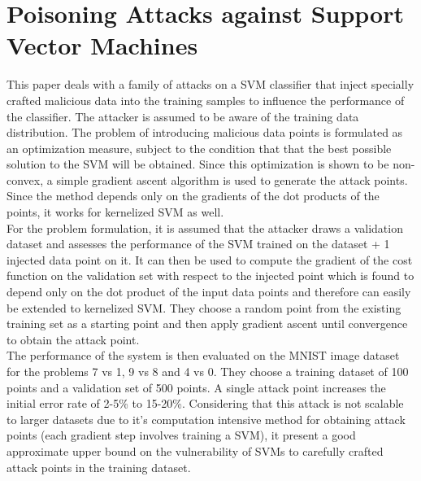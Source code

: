 \documentclass[11pt]{article}
\begin{document}
\section{Poisoning Attacks against Support Vector Machines} 
This paper deals with a family of attacks on a SVM classifier that inject specially crafted malicious data into the training samples to influence the performance of the classifier. The attacker is assumed to be aware of the training data distribution. The problem of introducing malicious data points is formulated as an optimization measure, subject to the condition that that the best possible solution to the SVM will be obtained. Since this optimization is shown to be non-convex, a simple gradient ascent algorithm is used to generate the attack points. Since the method depends only on the gradients of the dot products of the points, it works for kernelized SVM as well. \\For the problem formulation, it is assumed that the attacker draws a validation dataset and assesses the performance of the SVM trained on the dataset + 1 injected data point on it. It can then be used to compute the gradient of the cost function on the validation set with respect to the injected point which is found to depend only on the dot product of the input data points and therefore can easily be extended to kernelized SVM. They choose a random point from the existing training set as a starting point and then apply gradient ascent until convergence to obtain the attack point.\\
The performance of the system is then evaluated on the MNIST image dataset for the problems 7 vs 1, 9 vs 8 and 4 vs 0. They choose a training dataset of 100 points and a validation set of 500 points. A single attack point increases the initial error rate of 2-5\% to 15-20\%. Considering that this attack is not scalable to larger datasets due to it's computation intensive method for obtaining attack points (each gradient step involves training a SVM), it present a good approximate upper bound on the vulnerability of SVMs to carefully crafted attack points in the training dataset. \\ \\
\end{document}
